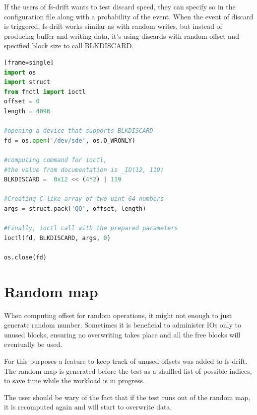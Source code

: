 \documentclass[
  color, %
  table, %
  lof,   %
  lot,   %
]{fithesis3}
\begin{document}
If the users of fs-drift wants to test discard speed, they can specify so in the configuration file along with a probability of the event. When the event of discard is triggered, fs-drift works similar as with random writes, but instead of producing buffer and writing data, it's using discards with random offset and specified block size to call BLKDISCARD.



\clearpage
\begin{lstlisting}[language=Python, caption={Using BLKDISCARD ioctl to discard first $\SI{4096}{\byte}$ of a device /dev/sde},label={ex:blkdiscard}][frame=single]
import os
import struct
from fnctl import ioctl
offset = 0
length = 4096

#opening a device that supports BLKDISCARD
fd = os.open('/dev/sde', os.O_WRONLY)    

#computing command for ioctl,
#the value from documentation is _IO(12, 119)
BLKDISCARD =  0x12 << (4*2) | 119

#Creating C-like array of two uint_64 numbers
args = struct.pack('QQ', offset, length)

#Finally, ioctl call with the prepared parameters
ioctl(fd, BLKDISCARD, args, 0)

os.close(fd)
\end{lstlisting}


\section{Random map}
When computing offset for random operations, it might not enough to just generate random number. Sometimes it is beneficial to administer IOs only to unused blocks, ensuring no overwriting takes place and all the free blocks will eventually be used.

For this purposes a feature to keep track of unused offsets was added to fs-drift. The random map is generated before the test as a shuffled list of possible indices, to save time while the workload is in progress.

The user should be wary of the fact that if the test runs out of the random map, it is recomputed again and will start to overwrite data.
\end{document}
